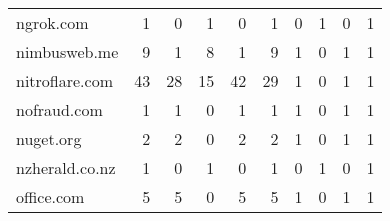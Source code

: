 \begin{tabular}{lrrrrrrrrr}
                  ngrok.com &                                1 &                                  0 &                                      1 &                            0 &                           1 &                                   0 &                                      1 &                             0 &                            1 \\
               nimbusweb.me &                                9 &                                  1 &                                      8 &                            1 &                           9 &                                   1 &                                      0 &                             1 &                            1 \\
             nitroflare.com &                               43 &                                 28 &                                     15 &                           42 &                          29 &                                   1 &                                      0 &                             1 &                            1 \\
                nofraud.com &                                1 &                                  1 &                                      0 &                            1 &                           1 &                                   1 &                                      0 &                             1 &                            1 \\
                  nuget.org &                                2 &                                  2 &                                      0 &                            2 &                           2 &                                   1 &                                      0 &                             1 &                            1 \\
             nzherald.co.nz &                                1 &                                  0 &                                      1 &                            0 &                           1 &                                   0 &                                      1 &                             0 &                            1 \\
                 office.com &                                5 &                                  5 &                                      0 &                            5 &                           5 &                                   1 &                                      0 &                             1 &                            1 \\

\end{tabular}
